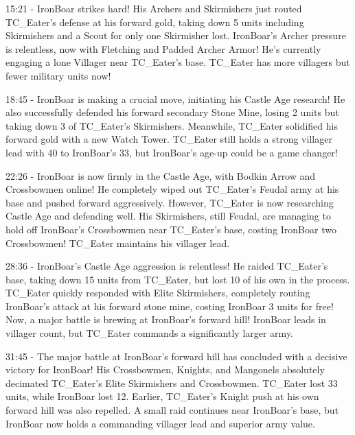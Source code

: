 15:21 - IronBoar strikes hard! His Archers and Skirmishers just routed TC\_Eater's defense at his forward gold, taking down 5 units including Skirmishers and a Scout for only one Skirmisher lost. IronBoar's Archer pressure is relentless, now with Fletching and Padded Archer Armor! He's currently engaging a lone Villager near TC\_Eater's base. TC\_Eater has more villagers but fewer military units now! \par \vspace{1em}

18:45 - IronBoar is making a crucial move, initiating his Castle Age research! He also successfully defended his forward secondary Stone Mine, losing 2 units but taking down 3 of TC\_Eater's Skirmishers. Meanwhile, TC\_Eater solidified his forward gold with a new Watch Tower. TC\_Eater still holds a strong villager lead with 40 to IronBoar's 33, but IronBoar's age-up could be a game changer! \par \vspace{1em}

22:26 - IronBoar is now firmly in the Castle Age, with Bodkin Arrow and Crossbowmen online! He completely wiped out TC\_Eater's Feudal army at his base and pushed forward aggressively. However, TC\_Eater is now researching Castle Age and defending well. His Skirmishers, still Feudal, are managing to hold off IronBoar's Crossbowmen near TC\_Eater's base, costing IronBoar two Crossbowmen! TC\_Eater maintains his villager lead. \par \vspace{1em}

28:36 - IronBoar's Castle Age aggression is relentless! He raided TC\_Eater's base, taking down 15 units from TC\_Eater, but lost 10 of his own in the process. TC\_Eater quickly responded with Elite Skirmishers, completely routing IronBoar's attack at his forward stone mine, costing IronBoar 3 units for free! Now, a major battle is brewing at IronBoar's forward hill! IronBoar leads in villager count, but TC\_Eater commands a significantly larger army. \par \vspace{1em}

31:45 - The major battle at IronBoar's forward hill has concluded with a decisive victory for IronBoar! His Crossbowmen, Knights, and Mangonels absolutely decimated TC\_Eater's Elite Skirmishers and Crossbowmen. TC\_Eater lost 33 units, while IronBoar lost 12. Earlier, TC\_Eater's Knight push at his own forward hill was also repelled. A small raid continues near IronBoar's base, but IronBoar now holds a commanding villager lead and superior army value. \par \vspace{1em}

